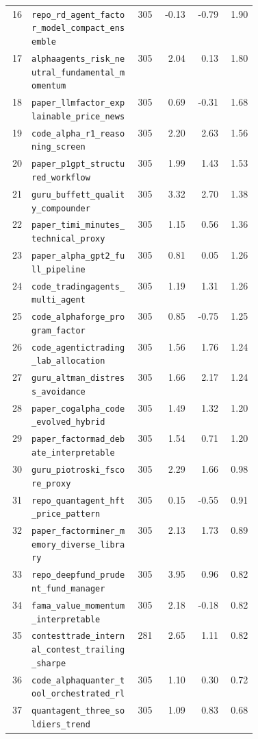 \begin{scriptsize}
\begin{longtable}{r>{\raggedright\arraybackslash}p{0.42\linewidth}rrrr}
16 & \nolinkurl{repo_rd_agent_factor_model_compact_ensemble} & 305 & -0.13 & -0.79 & 1.90\\
17 & \nolinkurl{alphaagents_risk_neutral_fundamental_momentum} & 305 & 2.04 & 0.13 & 1.80\\
18 & \nolinkurl{paper_llmfactor_explainable_price_news} & 305 & 0.69 & -0.31 & 1.68\\
19 & \nolinkurl{code_alpha_r1_reasoning_screen} & 305 & 2.20 & 2.63 & 1.56\\
20 & \nolinkurl{paper_p1gpt_structured_workflow} & 305 & 1.99 & 1.43 & 1.53\\
21 & \nolinkurl{guru_buffett_quality_compounder} & 305 & 3.32 & 2.70 & 1.38\\
22 & \nolinkurl{paper_timi_minutes_technical_proxy} & 305 & 1.15 & 0.56 & 1.36\\
23 & \nolinkurl{paper_alpha_gpt2_full_pipeline} & 305 & 0.81 & 0.05 & 1.26\\
24 & \nolinkurl{code_tradingagents_multi_agent} & 305 & 1.19 & 1.31 & 1.26\\
25 & \nolinkurl{code_alphaforge_program_factor} & 305 & 0.85 & -0.75 & 1.25\\
26 & \nolinkurl{code_agentictrading_lab_allocation} & 305 & 1.56 & 1.76 & 1.24\\
27 & \nolinkurl{guru_altman_distress_avoidance} & 305 & 1.66 & 2.17 & 1.24\\
28 & \nolinkurl{paper_cogalpha_code_evolved_hybrid} & 305 & 1.49 & 1.32 & 1.20\\
29 & \nolinkurl{paper_factormad_debate_interpretable} & 305 & 1.54 & 0.71 & 1.20\\
30 & \nolinkurl{guru_piotroski_fscore_proxy} & 305 & 2.29 & 1.66 & 0.98\\
31 & \nolinkurl{repo_quantagent_hft_price_pattern} & 305 & 0.15 & -0.55 & 0.91\\
32 & \nolinkurl{paper_factorminer_memory_diverse_library} & 305 & 2.13 & 1.73 & 0.89\\
33 & \nolinkurl{repo_deepfund_prudent_fund_manager} & 305 & 3.95 & 0.96 & 0.82\\
34 & \nolinkurl{fama_value_momentum_interpretable} & 305 & 2.18 & -0.18 & 0.82\\
35 & \nolinkurl{contesttrade_internal_contest_trailing_sharpe} & 281 & 2.65 & 1.11 & 0.82\\
36 & \nolinkurl{code_alphaquanter_tool_orchestrated_rl} & 305 & 1.10 & 0.30 & 0.72\\
37 & \nolinkurl{quantagent_three_soldiers_trend} & 305 & 1.09 & 0.83 & 0.68\\

\end{longtable}
\end{scriptsize}

